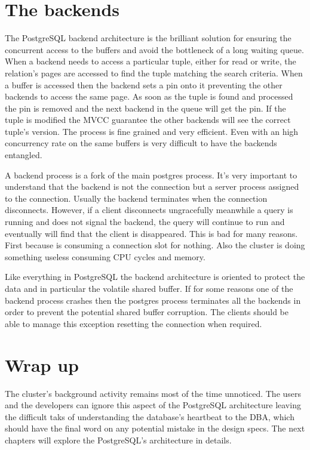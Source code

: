 \section{The backends}
The PostgreSQL backend architecture is the brilliant solution for ensuring the concurrent access to the 
buffers and avoid the bottleneck of a long waiting queue. When a backend needs to access a particular tuple, 
either for read or write, the relation's pages are accessed to find the tuple matching the search criteria. 
When a buffer is accessed then the backend sets a pin onto it preventing the other backends to access the 
same page. As soon as the tuple is found and processed the pin is removed and the next backend in the queue 
will get the pin. If the tuple is modified the MVCC guarantee the other backends will see the correct 
tuple's version. The process is fine grained and very efficient. Even with an high concurrency rate on the 
same buffers is very difficult to have the backends entangled.\newline

A backend process is a fork of the main postgres process. It's very important to understand that the 
backend is not the connection but a server process assigned to the connection. Usually the backend 
terminates when the connection disconnects. However, if a client disconnects ungracefully meanwhile a query 
is running and does not signal the backend, the query will continue to run and eventually will find 
that the client is disappeared.  This is bad for many reasons. First because is consuming 
a connection slot for nothing. Also the cluster is doing something useless consuming CPU cycles and memory. 
\newline

Like everything in PostgreSQL the backend architecture is oriented to protect the data and in particular 
the volatile shared buffer. If for some reasons one of the backend process crashes then the postgres 
process terminates all the backends in order to prevent the potential shared buffer corruption. The clients 
should be able to manage this exception resetting the connection when required.\newline

\section{Wrap up}
The cluster's background activity remains most of the time unnoticed. The users and the developers can 
ignore this aspect of the PostgreSQL architecture leaving the difficult taks of understanding the 
database's heartbeat to the DBA, which should have the final word on any potential mistake in the design 
specs. The next chapters will explore the PostgreSQL's architecture in details.
